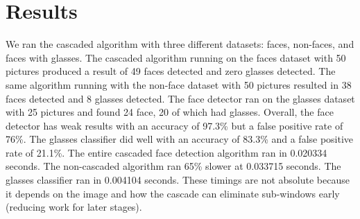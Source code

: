 \documentclass[12pt] {article}
\begin{document}
\section{Results}
We ran the cascaded algorithm with three different datasets: faces, non-faces, and faces with glasses. The cascaded algorithm running on the faces dataset with 50 pictures produced a result of 49 faces detected and zero glasses detected. The same algorithm running with the non-face dataset with 50 pictures resulted in 38 faces detected and 8 glasses detected. The face detector ran on the glasses dataset with 25 pictures and found 24 face, 20 of which had glasses. Overall, the face detector has weak results with an accuracy of 97.3\% but a false positive rate of 76\%. The glasses classifier did well with an accuracy of 83.3\% and a false positive rate of 21.1\%. The entire cascaded face detection algorithm ran in 0.020334 seconds. The non-cascaded algorithm ran 65\% slower at 0.033715 seconds. The glasses classifier ran in 0.004104 seconds. These timings are not absolute because it depends on the image and how the cascade can eliminate sub-windows early (reducing work for later stages).
\end{document}
